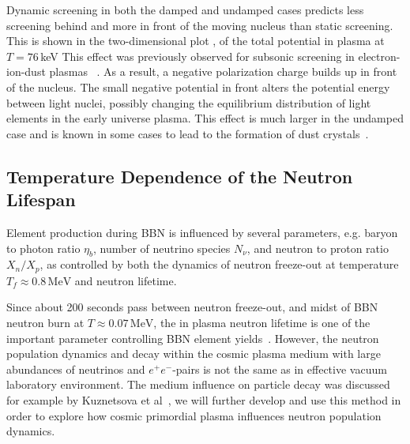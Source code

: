 Dynamic screening in both the damped and undamped cases predicts less screening behind and more in front of the moving nucleus than static screening. This is shown in the two-dimensional plot , of the total potential in plasma at $T=76\,$keV This effect was previously observed for subsonic screening in electron-ion-dust plasmas ~\cite{Stenflo:1973,Shukla:2002ppcf,Lampe:2000pop}. As a result, a negative polarization charge builds up in front of the nucleus. The small negative potential in front alters the potential energy between light nuclei, possibly changing the equilibrium distribution of light elements in the early universe plasma. This effect is much larger in the undamped case and is known in some cases to lead to the formation of dust crystals~\cite{Shukla:1996ccc}. 








\subsection{Temperature Dependence of the Neutron Lifespan}
Element production during BBN is influenced by several parameters, e.g. baryon to photon ratio $\eta_b$, number of neutrino species $N_\nu$, and neutron to proton ratio $X_n/X_p$, as controlled by both the dynamics of neutron freeze-out at temperature $T_f\approx 0.8\,\mathrm{MeV}$ and neutron lifetime.

Since about 200 seconds pass between neutron freeze-out, and midst of BBN neutron burn at $T\approx0.07\,\mathrm{MeV}$, the in plasma neutron lifetime is one of the important parameter controlling BBN element yields~\cite{Pitrou:2018cgg}. However, the neutron population dynamics and decay within the cosmic plasma medium with large abundances of neutrinos and $e^+e^-$-pairs is not the same as in effective vacuum laboratory environment. The medium influence on particle decay was discussed for example by Kuznetsova et al~\cite{Kuznetsova:2010pi}, we will further develop and use this method in order  to explore how cosmic primordial plasma influences neutron population dynamics.
 
